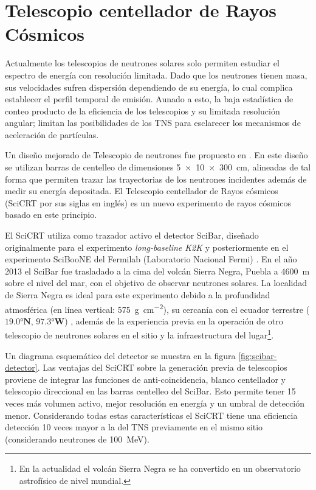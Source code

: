 
\chapter{Telescopio centellador de Rayos Cósmicos}
\label{chap:dos}

Actualmente los telescopios de neutrones solares solo permiten estudiar el espectro de energía con resolución limitada. Dado que los neutrones tienen masa, sus velocidades sufren dispersión dependiendo de su energía, lo cual complica establecer el perfil temporal de emisión. Aunado a esto, la baja estadística de conteo producto de la eficiencia de los telescopios y su limitada resolución angular; limitan las posibilidades de los TNS para esclarecer los mecanismos de aceleración de partículas.

Un diseño mejorado de Telescopio de neutrones fue propuesto en \cite{sako03}. En este diseño se utilizan barras de centelleo de dimensiones \SI[product-units=power]{5x10x300}{\cm}, alineadas de tal forma que permiten trazar las trayectorias de los neutrones incidentes además de medir su energía depositada. El Telescopio centellador de Rayos cósmicos (SciCRT por sus siglas en inglés) es un nuevo experimento de rayos cósmicos basado en este principio.

El SciCRT utiliza como trazador activo el detector SciBar, diseñado originalmente para el experimento \emph{long-baseline K2K} \cite{knitta04} y posteriormente en el experimento SciBooNE del Fermilab (Laboratorio Nacional Fermi) \cite{hiraide06}. En el año \num{2013} el SciBar fue trasladado a la cima del volcán Sierra Negra, Puebla a \SI{4600}{\metre} sobre el nivel del mar, con el objetivo de observar neutrones solares. La localidad de Sierra Negra es ideal para este experimento debido a la profundidad atmosférica (en línea vertical: \SI{575}{\gram\per\square\centi\metre}), su cercanía con el ecuador terrestre ($\ang{19.0}\mathbf{N}$, $\ang{97.3}\mathbf{W}$) , además de la experiencia previa en la operación de otro telescopio de neutrones solares en el sitio y la infraestructura del lugar\footnote{En la actualidad el volcán Sierra Negra se ha convertido en un observatorio astrofísico de nivel mundial.}.

Un diagrama esquemático del detector se muestra en la figura \ref{fig:scibar-detector}. Las ventajas del SciCRT sobre la generación previa de telescopios proviene de integrar las funciones de anti-coincidencia, blanco centellador y telescopio direccional en las barras centelleo del SciBar. Esto permite tener \num{15} veces más volumen activo, mejor resolución en energía y un umbral de detección menor. Considerando todas estas características el SciCRT tiene una eficiencia detección \num{10} veces mayor a la del TNS previamente en el mismo sitio \cite{ynagai14} (considerando neutrones de \SI{100}{\mega\electronvolt}).

